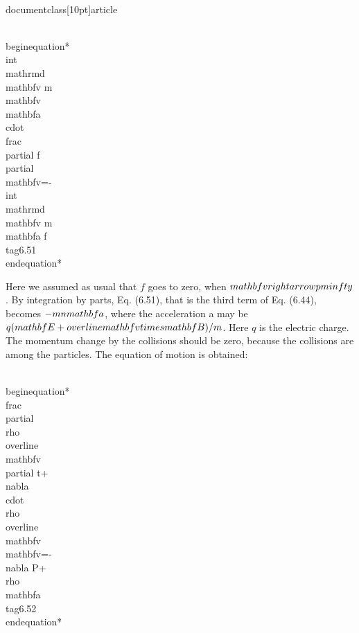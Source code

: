 \\documentclass[10pt]{article}
\begin{document}
{{{{\\begin{equation*}
\\int \\mathrm{d} \\mathbf{v} m \\mathbf{v} \\mathbf{a} \\cdot \\frac{\\partial f}{\\partial \\mathbf{v}}=-\\int \\mathrm{d} \\mathbf{v} m \\mathbf{a} f \\tag{6.51}
\\end{equation*}


Here we assumed as usual that $f$ goes to zero, when $\\mathbf{v} \\rightarrow \\pm \\infty$. By integration by parts, Eq. (6.51), that is the third term of Eq. (6.44), becomes $-m n \\mathbf{a}$, where the acceleration a may be $q(\\mathbf{E}+\\overline{\\mathbf{v}} \\times \\mathbf{B}) / m$. Here $q$ is the electric charge. The momentum change by the collisions should be zero, because the collisions are among the particles. The equation of motion is obtained:


\\begin{equation*}
\\frac{\\partial \\rho \\overline{\\mathbf{v}}}{\\partial t}+\\nabla \\cdot \\rho \\overline{\\mathbf{v}} \\mathbf{v}=-\\nabla P+\\rho \\mathbf{a} \\tag{6.52}
\\end{equation*}


}}}}
\end{document}
